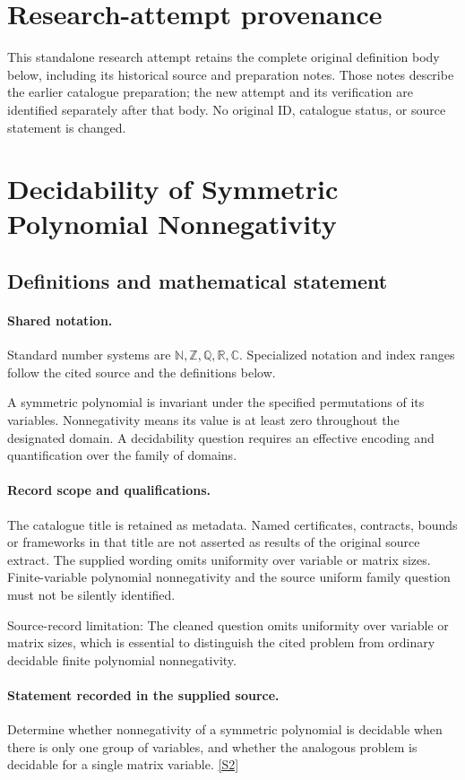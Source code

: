 \documentclass[11pt]{article}
\begin{document}
\section*{Research-attempt provenance}
This standalone research attempt retains the complete original definition body below,
including its historical source and preparation notes. Those notes describe the
earlier catalogue preparation; the new attempt and its verification are identified
separately after that body. No original ID, catalogue status, or source statement is changed.

\section{Decidability of Symmetric Polynomial Nonnegativity}\label{statement}

\subsection{Definitions and mathematical statement}

\paragraph{Shared notation.}Standard number systems are $\mathbb N,\mathbb Z,\mathbb Q,\mathbb R,\mathbb C$. Specialized notation and index ranges follow the cited source and the definitions below.


A symmetric polynomial is invariant under the specified permutations of its variables. Nonnegativity means its value is at least zero throughout the designated domain. A decidability question requires an effective encoding and quantification over the family of domains.
\paragraph{Record scope and qualifications.}
The catalogue title is retained as metadata. Named certificates, contracts, bounds or frameworks in that title are not asserted as results of the original source extract.
The supplied wording omits uniformity over variable or matrix sizes. Finite-variable polynomial nonnegativity and the source uniform family question must not be silently identified.

Source-record limitation: The cleaned question omits uniformity over variable or matrix sizes, which is essential to distinguish the cited problem from ordinary decidable finite polynomial nonnegativity.
\paragraph{Statement recorded in the supplied source.}
Determine whether nonnegativity of a symmetric polynomial is decidable when there is only one group of variables, and whether the analogous problem is decidable for a single matrix variable. \href{https://doi.org/10.4171/owr/2025/9}{[S2]}
\end{document}
